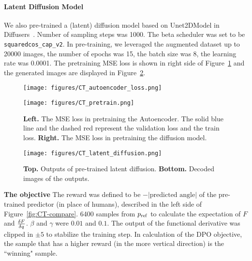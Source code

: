 \paragraph{Latent Diffusion Model}
We also pre-trained a (latent) diffusion model based on Unet2DModel in Diffusers~\cite{huggingface2022Diffusers}. Number of sampling steps was 1000. The beta scheduler was set to be \texttt{squaredcos\_cap\_v2}.
In pre-training, we leveraged the augmented dataset up to 20000 images, the number of epochs was 15, the batch size was 8, the learning rate was 0.0001. The pretraining MSE loss is shown in right side of Figure~\ref{fig:CT-pretrain} and the generated images are displayed in Figure~\ref{fig:CT-latentdiffusion}.
\begin{figure}[htbp]
\centering
\begin{minipage}[htbp]{0.49\columnwidth}
    \centering
    \texttt{[image: figures/CT\_autoencoder\_loss.png]}
    \label{fig:CT-autoencoder-loss}
\end{minipage}
\begin{minipage}[htbp]{0.49\columnwidth}
    \centering
    \texttt{[image: figures/CT\_pretrain.png]}
    \label{fig:CT-diffusion}
\end{minipage}
\caption{
\textbf{Left.} The MSE loss in pretraining the Autoencoder. The solid blue line and the dashed red represent the validation loss and the train loss.
\textbf{Right.} The MSE loss in pretraining the diffusion model.}
\label{fig:CT-pretrain}
\end{figure}

\begin{figure}[htbp]
    \centering
    \texttt{[image: figures/CT\_latent\_diffusion.png]}
    \caption{\textbf{Top.} Outputs of pre-trained latent diffusion. \textbf{Bottom.} Decoded images of the outputs. }
    \label{fig:CT-latentdiffusion}
\end{figure}

\textbf{The objective}
The reward was defined to be $-|\text{predicted angle}|$ of the pre-trained predictor (in place of humans), described in the left side of Figure~\ref{fig:CT-compare}.
6400 samples from $p_{\rm{ref}}$ to calculate the expectation of $F$ and $\frac{\delta F}{\delta q}$. $\beta$ and $\gamma$ were $0.01$ and $0.1$. The output of the functional derivative was clipped in $\pm 5$ to stabilize the training step. In calculation of the DPO objective, the sample that has a higher reward (in the more vertical direction) is the ``winning" sample.


